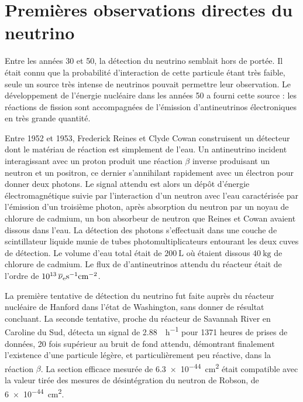     \section{Premières observations directes du neutrino}

      Entre les années 30 et 50, la détection du neutrino semblait hors de portée. Il était connu que la probabilité d'interaction de cette particule étant très faible, seule un source très intense de neutrinos pouvait permettre leur observation. Le développement de l'énergie nucléaire dans les années 50 a fourni cette source : les réactions de fission sont accompagnées de l'émission d'antineutrinos électroniques en très grande quantité.

      Entre 1952 et 1953, Frederick Reines et Clyde Cowan construisent un détecteur dont le matériau de réaction est simplement de l'eau. Un antineutrino incident interagissant avec un proton produit une réaction $\beta$ inverse produisant un neutron et un positron, ce dernier s'annihilant rapidement avec un électron pour donner deux photons. Le signal attendu est alors un dépôt d'énergie électromagnétique suivie par l'interaction d'un neutron avec l'eau caractérisée par l'émission d'un troisième photon, après absorption du neutron par un noyau de chlorure de cadmium, un bon absorbeur de neutron que Reines et Cowan avaient dissous dans l'eau. La détection des photons s'effectuait dans une couche de scintillateur liquide munie de tubes photomultiplicateurs entourant les deux cuves de détection. Le volume d'eau total était de $\SI{200}{\liter}$ où étaient dissous $\SI{40}{\kilogram}$ de chlorure de cadmium. Le flux de d'antineutrinos attendu du réacteur était de l'ordre de $\SI{e13}{\overline{\nu}_e\second^{-1}\centi\meter^{-2}}$.

      La première tentative de détection du neutrino fut faite auprès du réacteur nucléaire de Hanford dans l'état de Washington, sans donner de résultat concluant. La seconde tentative, proche du réacteur de Savannah River en Caroline du Sud, détecta un signal de \SI{2.88}{\per\hour}\cite{Cowan1956} pour 1371 heures de prises de données, 20 fois supérieur au bruit de fond attendu, démontrant finalement l'existence d'une particule légère, et particulièrement peu réactive, dans la réaction $\beta$. La section efficace mesurée de  \SI{6.3e-44}{\centi\meter\squared} était compatible avec la valeur tirée des mesures de désintégration du neutron de Robson\cite{Robson1951}, de \SI{6e-44}{\centi\meter\squared}.

